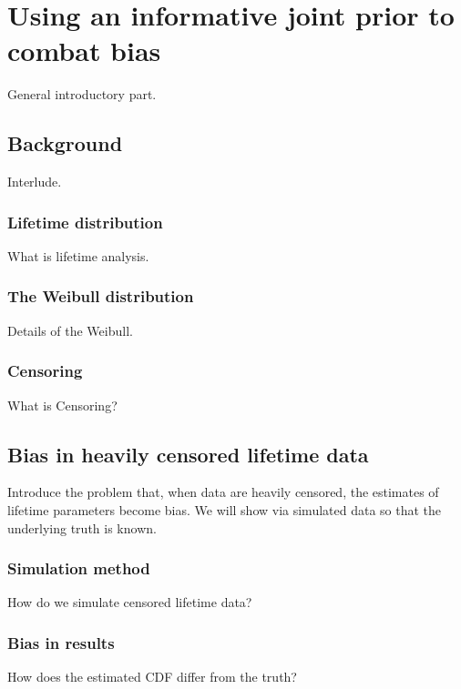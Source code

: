 \chapter{Using an informative joint prior to combat bias}\label{chap:chapter2}

General introductory part.

\section{Background}

Interlude.

\subsection{Lifetime distribution}

What is lifetime analysis.

\subsection{The Weibull distribution}

Details of the Weibull.

\subsection{Censoring}

What is Censoring?

\section{Bias in heavily censored lifetime data}

Introduce the problem that, when data are heavily censored, the estimates of lifetime parameters become bias. We will show via simulated data so that the underlying truth is known.

\subsection{Simulation method}

How do we simulate censored lifetime data?

\subsection{Bias in results}

How does the estimated CDF differ from the truth?

